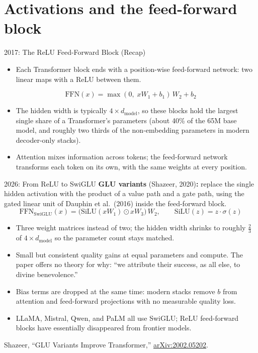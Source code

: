 \section{Activations and the feed-forward block}

\begin{frame}{2017: The ReLU Feed-Forward Block (Recap)}
  \begin{itemize}
    \item[$\blacktriangleright$] Each Transformer block ends with a position-wise feed-forward network: two linear maps with a ReLU between them.
  \end{itemize}

  \vspace{0.5em}
  \[
    \mathrm{FFN}(x) = \max(0,\; x W_1 + b_1)\, W_2 + b_2
  \]

  \vspace{0.5em}
  \begin{itemize}
    \item[$\blacktriangleright$] The hidden width is typically $4 \times d_{\text{model}}$, so these blocks hold the largest single share of a Transformer's parameters (about 40\% of the 65M base model, and roughly two thirds of the non-embedding parameters in modern decoder-only stacks).
    \item[$\blacktriangleright$] Attention mixes information across tokens; the feed-forward network transforms each token on its own, with the same weights at every position.
  \end{itemize}
\end{frame}

\begin{frame}{2026: From ReLU to SwiGLU}
  \textbf{GLU variants} (Shazeer, 2020)\textbf{:} replace the single hidden activation with the product of a value path and a gate path, using the gated linear unit of Dauphin et al.\ (2016) inside the feed-forward block.
  \[
    \mathrm{FFN}_{\text{SwiGLU}}(x) = \big(\mathrm{SiLU}(x W_1) \odot x W_3\big)\, W_2,
    \qquad
    \mathrm{SiLU}(z) = z \cdot \sigma(z)
  \]

  \vspace{0.4em}
  \begin{itemize}
    \item[$\blacktriangleright$] Three weight matrices instead of two; the hidden width shrinks to roughly $\tfrac{2}{3}$ of $4 \times d_{\text{model}}$ so the parameter count stays matched.
    \item[$\blacktriangleright$] Small but consistent quality gains at equal parameters and compute. The paper offers no theory for why: ``we attribute their success, as all else, to divine benevolence.''
    \item[$\blacktriangleright$] Bias terms are dropped at the same time: modern stacks remove $b$ from attention and feed-forward projections with no measurable quality loss.
    \item[$\blacktriangleright$] LLaMA, Mistral, Qwen, and PaLM all use SwiGLU; ReLU feed-forward blocks have essentially disappeared from frontier models.
  \end{itemize}
  \vfill
  {\scriptsize Shazeer, ``GLU Variants Improve Transformer,'' \href{https://arxiv.org/abs/2002.05202}{arXiv:2002.05202}.}
\end{frame}
